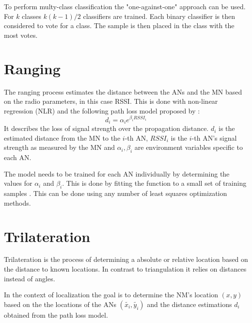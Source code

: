 To perform multy-class classification the "one-against-one" approach can be used. For \(k\) classes \(k\left ( k-1 \right )/2\) classifiers are trained. Each binary classifier is then considered to vote for a class. The sample is then placed in the class with the most votes\cite{chang2011libsvm}.


\section{Ranging}
\label{Ranging}

The ranging process estimates the distance between the ANs and the MN based on the radio parameters, in this case RSSI. This is done with non-linear regression (NLR) and the following path loss model proposed by \cite{li2015passiveWIFIsource}:
\begin{equation}
d_{i}=\alpha_{i}e^{\beta_{i}RSSI_{i}}
\label{eqn:non-linear path loss model}
\end{equation}
It describes the loss of signal strength over the propagation distance. \(d_{i}\) is the estimated distance from the MN to the \(i\)-th AN, \(RSSI_{i}\) is the \(i\)-th AN's signal strength as measured by the MN and \(\alpha_{i}, \beta_{i}\) are environment variables specific to each AN.

The model needs to be trained for each AN individually by determining the values for \(\alpha_{i}\) and \(\beta_{i}\). This is done by fitting the function to a small set of training samples . This can be done using any number of least squares optimization methods.

\section{Trilateration}

Trilateration is the process of determining a absolute or relative location based on the distance to known locations. In contrast to triangulation it relies on distances instead of angles.

In the context of localization the goal is to determine the NM's location \(\left ( x,y \right )\) based on the the locations of the ANs \(\left ( \tilde{x_{i}},\tilde{y_{i}} \right )\) and the distance estimations \(d_{i}\) obtained from the path loss model.

